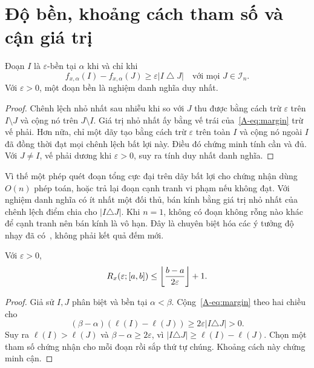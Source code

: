 \section{Độ bền, khoảng cách tham số và cận giá trị}
\begin{lemma}\label{A-lem:box}
Đoạn $I$ là $\varepsilon$-bền tại $\alpha$ khi và chỉ khi
\begin{equation}\label{A-eq:margin}
f_{x,\alpha}(I)-f_{x,\alpha}(J)\ge\varepsilon|I\mathbin{\triangle}J|
\quad\text{với mọi }J\in\mathcal I_n.
\end{equation}
Với $\varepsilon>0$, một đoạn bền là nghiệm danh nghĩa duy nhất.
\end{lemma}
\begin{proof}
Chênh lệch nhỏ nhất sau nhiễu khi so với $J$ thu được bằng cách trừ $\varepsilon$ trên $I\setminus J$ và cộng nó trên $J\setminus I$. Giá trị nhỏ nhất ấy bằng vế trái của~\eqref{A-eq:margin} trừ vế phải. Hơn nữa, chỉ một dãy tạo bằng cách trừ $\varepsilon$ trên toàn $I$ và cộng nó ngoài $I$ đã đồng thời đạt mọi chênh lệch bất lợi này. Điều đó chứng minh tính cần và đủ. Với $J\ne I$, vế phải dương khi $\varepsilon>0$, suy ra tính duy nhất danh nghĩa.
\end{proof}
Vì thế một phép quét đoạn tổng cực đại trên dãy bất lợi cho chứng nhận dùng $O(n)$ phép toán, hoặc trả lại đoạn cạnh tranh vi phạm nếu không đạt. Với nghiệm danh nghĩa có ít nhất một đối thủ, bán kính bằng giá trị nhỏ nhất của chênh lệch điểm chia cho $|I\triangle J|$. Khi $n=1$, không có đoạn không rỗng nào khác để cạnh tranh nên bán kính là vô hạn. Đây là chuyên biệt hóa các ý tưởng độ nhạy đã có~\cite{chak}, không phải kết quả đếm mới.

\begin{proposition}\label{A-prop:packing}
Với $\varepsilon>0$,
\begin{equation}\label{A-eq:packing}
R_x(\varepsilon;[a,b])\le\left\lfloor \frac{b-a}{2\varepsilon}\right\rfloor+1.
\end{equation}
\end{proposition}
\begin{proof}
Giả sử $I,J$ phân biệt và bền tại $\alpha<\beta$. Cộng~\eqref{A-eq:margin} theo hai chiều cho
\begin{equation}\label{A-eq:separation}
(\beta-\alpha)(\ell(I)-\ell(J))\ge2\varepsilon|I\triangle J|>0.
\end{equation}
Suy ra $\ell(I)>\ell(J)$ và $\beta-\alpha\ge2\varepsilon$, vì $|I\triangle J|\ge\ell(I)-\ell(J)$. Chọn một tham số chứng nhận cho mỗi đoạn rồi sắp thứ tự chúng. Khoảng cách này chứng minh cận.
\end{proof}

